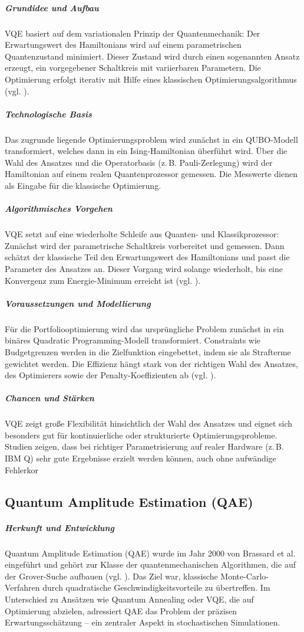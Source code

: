 \subparagraph{Grundidee und Aufbau}
VQE basiert auf dem variationalen Prinzip der Quantenmechanik: Der Erwartungswert des Hamiltonians wird auf einem parametrischen Quantenzustand minimiert. Dieser Zustand wird durch einen sogenannten Ansatz erzeugt, ein vorgegebener Schaltkreis mit variierbaren Parametern. Die Optimierung erfolgt iterativ mit Hilfe eines klassischen Optimierungsalgorithmus (vgl. \cite{buonaiuto_best_2023}).

\subparagraph{Technologische Basis}
Das zugrunde liegende Optimierungsproblem wird zunächst in ein QUBO-Modell transformiert, welches dann in ein Ising-Hamiltonian überführt wird. Über die Wahl des Ansatzes und die Operatorbasis (z.\,B. Pauli-Zerlegung) wird der Hamiltonian auf einem realen Quantenprozessor gemessen. Die Messwerte dienen als Eingabe für die klassische Optimierung.

\subparagraph{Algorithmisches Vorgehen}
VQE setzt auf eine wiederholte Schleife aus Quanten- und Klassikprozessor: Zunächst wird der parametrische Schaltkreis vorbereitet und gemessen. Dann schätzt der klassische Teil den Erwartungswert des Hamiltonians und passt die Parameter des Ansatzes an. Dieser Vorgang wird solange wiederholt, bis eine Konvergenz zum Energie-Minimum erreicht ist (vgl. \cite{buonaiuto_best_2023}).

\subparagraph{Voraussetzungen und Modellierung}
Für die Portfoliooptimierung wird das ursprüngliche Problem zunächst in ein binäres Quadratic Programming-Modell transformiert. Constraints wie Budgetgrenzen werden in die Zielfunktion eingebettet, indem sie als Strafterme gewichtet werden. Die Effizienz hängt stark von der richtigen Wahl des Ansatzes, des Optimierers sowie der Penalty-Koeffizienten ab (vgl. \cite{buonaiuto_best_2023}).

\subparagraph{Chancen und Stärken}
VQE zeigt große Flexibilität hinsichtlich der Wahl des Ansatzes und eignet sich besonders gut für kontinuierliche oder strukturierte Optimierungsprobleme. Studien zeigen, dass bei richtiger Parametrisierung auf realer Hardware (z.\,B. IBM Q) sehr gute Ergebnisse erzielt werden können, auch ohne aufwändige Fehlerkor


\subsection{Quantum Amplitude Estimation (QAE)}

\subparagraph{Herkunft und Entwicklung}
Quantum Amplitude Estimation (QAE) wurde im Jahr 2000 von Brassard et al. eingeführt und gehört zur Klasse der quantenmechanischen Algorithmen, die auf der Grover-Suche aufbauen (vgl. \cite{quantumjournal2020}). Das Ziel war, klassische Monte-Carlo-Verfahren durch quadratische Geschwindigkeitsvorteile zu übertreffen. Im Unterschied zu Ansätzen wie Quantum Annealing oder VQE, die auf Optimierung abzielen, adressiert QAE das Problem der präzisen Erwartungsschätzung – ein zentraler Aspekt in stochastischen Simulationen.


